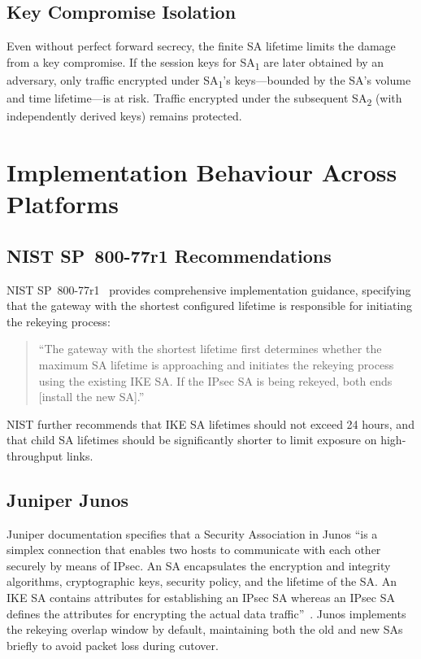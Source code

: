 \documentclass[sigconf,nonacm]{acmart}
\begin{document}
\subsection{Key Compromise Isolation}

Even without perfect forward secrecy, the finite SA lifetime limits the damage from a
key compromise. If the session keys for SA\textsubscript{1} are later obtained by an
adversary, only traffic encrypted under SA\textsubscript{1}'s keys---bounded by the
SA's volume and time lifetime---is at risk. Traffic encrypted under the subsequent
SA\textsubscript{2} (with independently derived keys) remains protected.

\section{Implementation Behaviour Across Platforms}
\label{sec:implementation}

\subsection{NIST SP~800-77r1 Recommendations}

NIST SP~800-77r1~\cite{nist80077} provides comprehensive implementation guidance,
specifying that the gateway with the shortest configured lifetime is responsible for
initiating the rekeying process:

\begin{quote}
\small
``The gateway with the shortest lifetime first determines whether the maximum SA
lifetime is approaching and initiates the rekeying process using the existing IKE
SA. If the IPsec SA is being rekeyed, both ends [install the new SA].''
\end{quote}

NIST further recommends that IKE SA lifetimes should not exceed 24 hours, and that
child SA lifetimes should be significantly shorter to limit exposure on high-throughput
links.

\subsection{Juniper Junos}

Juniper documentation specifies that a Security Association in Junos ``is a simplex
connection that enables two hosts to communicate with each other securely by means of
IPsec. An SA encapsulates the encryption and integrity algorithms, cryptographic keys,
security policy, and the lifetime of the SA. An IKE SA contains attributes for
establishing an IPsec SA whereas an IPsec SA defines the attributes for encrypting the
actual data traffic''~\cite{juniper}. Junos implements the rekeying overlap window by
default, maintaining both the old and new SAs briefly to avoid packet loss during
cutover.
\end{document}
